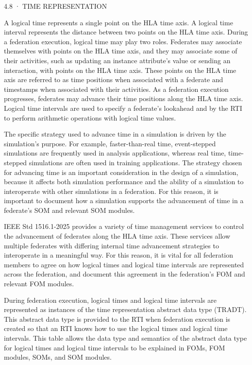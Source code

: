 \documentclass[10pt]{article}
\newcommand{\caps}[1]{{\sffamily\fontsize{7.4}{9}\selectfont\addfontfeatures{LetterSpace=5.0}\MakeUppercase{#1}}}
\begin{document}
\setcounter{page}{47}

{\caps{4.8 · Time Representation}}\par\vspace{5pt}

{\fontsize{8.9}{12.1}\selectfont
A logical time represents a single point on the HLA time axis. A logical time interval represents the distance between two points on the HLA time axis. During a federation execution, logical time may play two roles. Federates may associate themselves with points on the HLA time axis, and they may associate some of their activities, such as updating an instance attribute's value or sending an interaction, with points on the HLA time axis. These points on the HLA time axis are referred to as time positions when associated with a federate and timestamps when associated with their activities. As a federation execution progresses, federates may advance their time positions along the HLA time axis. Logical time intervals are used to specify a federate's lookahead and by the RTI to perform arithmetic operations with logical time values.

The specific strategy used to advance time in a simulation is driven by the simulation's purpose. For example, faster-than-real time, event-stepped simulations are frequently used in analysis applications, whereas real time, time-stepped simulations are often used in training applications. The strategy chosen for advancing time is an important consideration in the design of a simulation, because it affects both simulation performance and the ability of a simulation to interoperate with other simulations in a federation. For this reason, it is important to document how a simulation supports the advancement of time in a federate's SOM and relevant SOM modules.

IEEE Std 1516.1-2025 provides a variety of time management services to control the advancement of federates along the HLA time axis. These services allow multiple federates with differing internal time advancement strategies to interoperate in a meaningful way. For this reason, it is vital for all federation members to agree on how logical times and logical time intervals are represented across the federation, and document this agreement in the federation's FOM and relevant FOM modules.

During federation execution, logical times and logical time intervals are represented as instances of the time representation abstract data type (TRADT). This abstract data type is provided to the RTI when federation execution is created so that an RTI knows how to use the logical times and logical time intervals. This table allows the data type and semantics of the abstract data type for logical times and logical time intervals to be explained in FOMs, FOM modules, SOMs, and SOM modules.

}
\end{document}
